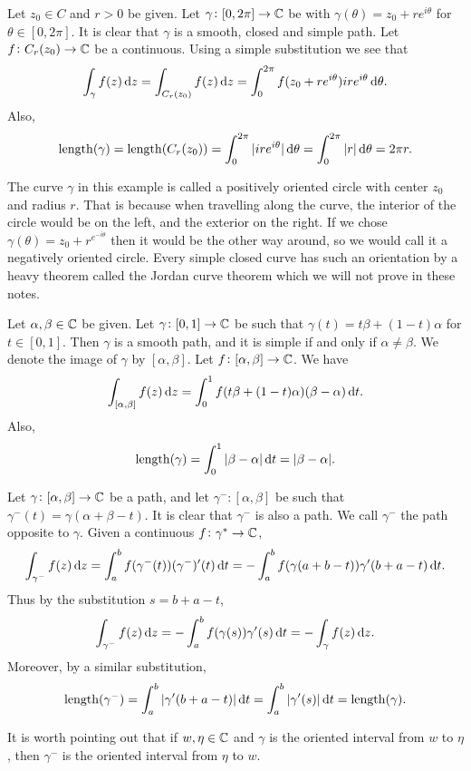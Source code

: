 \documentclass[11pt,a4paper]{article}
\newcommand{\length}{\mathrm{length}}
\begin{document}
\begin{example}
  Let $z_0 \in C$ and $r > 0$ be given.
  Let $\gamma \colon [0, 2 \pi] \to \mathbb{C}$ be with
  $\gamma(\theta) = z_0 + r e^{i \theta}$ for $\theta \in [0, 2 \pi]$.
  It is clear that $\gamma$ is a smooth, closed and simple path.
  Let $f \colon C_r(z_0) \to \mathbb{C}$ be a continuous.
  Using a simple substitution we see that
  \[
    \int_{\gamma} f(z) \dz =
    \int_{C_r(z_0)} f(z) \dz =
    \int_{0}^{2 \pi} f(z_0 + r e^{i \theta}) i r e^{i \theta} \dtheta.
  \]
  Also,
  \[
    \length(\gamma) =
    \length(C_r(z_0)) =
    \int_{0}^{2 \pi} |i r e^{i \theta}| \dtheta =
    \int_{0}^{2 \pi} |r| \dtheta =
    2 \pi r.
  \]
\end{example}
\begin{remark}
  The curve $\gamma$ in this example is called a positively oriented circle
  with center $z_0$ and radius $r$.
  That is because when travelling along the curve, the interior of the circle
  would be on the left, and the exterior on the right.
  If we chose $\gamma(\theta) = z_0 + r^{e^{- i \theta}}$ then it would
  be the other way around, so we would call it a negatively oriented circle.
  Every simple closed curve has such an orientation by a heavy theorem called
  the Jordan curve theorem which we will not prove in these notes.
\end{remark}

\begin{example}
  Let $\alpha, \beta \in \mathbb{C}$ be given.
  Let $\gamma \colon [0, 1] \to \mathbb{C}$ be such that
  $\gamma(t) = t \beta + (1 - t) \alpha$ for $t \in [0,1]$.
  Then $\gamma$ is a smooth path, and it is simple if and only 
  if $\alpha \neq \beta$. We denote the image of $\gamma$ by $[\alpha,\beta]$.
  Let $f \colon [\alpha,\beta] \to \mathbb{C}$.
  We have
  \[
    \int_{[\alpha,\beta]} f(z) \dz =
    \int_{0}^{1} f(t \beta + (1 - t) \alpha)(\beta - \alpha) \dt.
  \]
  Also,
  \[
    \length(\gamma) = \int_{0}^{1} |\beta - \alpha| \dt = |\beta - \alpha|.
  \]
\end{example}

\begin{example}
  Let $\gamma \colon [\alpha, \beta] \to \mathbb{C}$ be a path, and let
  $\gamma^- \colon [\alpha, \beta]$ be such that
  $\gamma^-(t) = \gamma(\alpha + \beta - t)$.
  It is clear that $\gamma^-$ is also a path.
  We call $\gamma^-$ the path opposite to $\gamma$.
  Given a continuous $f \colon \gamma^* \to \mathbb{C}$,
  \[
    \int_{\gamma^-} f(z) \dz =
    \int_{a}^{b} f(\gamma^-(t))(\gamma^-)'(t) \dt =
    - 
    \int_{a}^{b} f(\gamma(a + b - t))\gamma'(b + a - t) \dt.
  \]
  Thus by the substitution $s = b + a - t$,
  \[
    \int_{\gamma^-} f(z) \dz =
    - \int_{a}^{b} f(\gamma(s))\gamma'(s) \dt =
    - \int_{\gamma} f(z) \dz.
  \]
  Moreover, by a similar substitution,
  \[
    \length(\gamma^-) =
    \int_{a}^{b} |\gamma'(b + a - t)| \dt =
    \int_{a}^{b} |\gamma'(s)| \dt = \length(\gamma).
  \]
\end{example}
\begin{remark}
  It is worth pointing out that if $w, \eta \in \mathbb{C}$ and 
  $\gamma$ is the oriented interval from $w$ to $\eta$,
  then $\gamma^-$ is the oriented interval from $\eta$ to $w$.
\end{remark}
\end{document}
